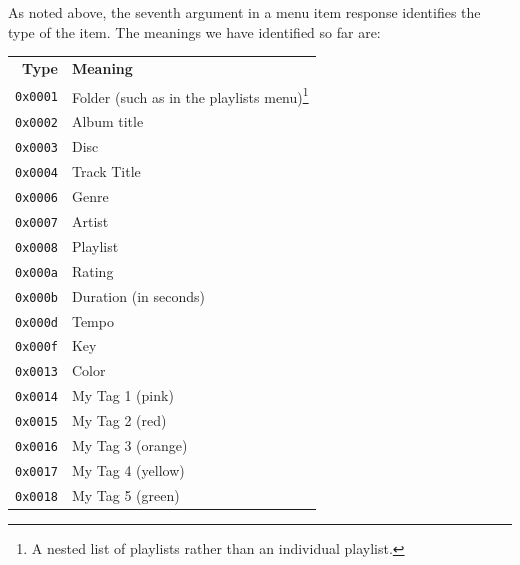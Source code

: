 \documentclass[11pt]{article}
\begin{document}
\begin{samepage}
  As noted above, the seventh argument in a menu item response
  identifies the type of the item. The meanings we have identified so
  far are:

  \begin{center}
    \begin{tabu}{rl}
      \toprule

      \bfseries{Type} & \bfseries{Meaning} \\

      {\tt 0x0001} & Folder (such as in the playlists menu)\footnote{A nested list
        of playlists rather than an individual playlist.} \\

      {\tt 0x0002} & Album title \\

      {\tt 0x0003} & Disc \\

      {\tt 0x0004} & Track Title \\

      {\tt 0x0006} & Genre \\

      {\tt 0x0007} & Artist \\

      {\tt 0x0008} & Playlist \\

      {\tt 0x000a} & Rating \\

      {\tt 0x000b} & Duration (in seconds) \\

      {\tt 0x000d} & Tempo \\

      {\tt 0x000f} & Key \\

      {\tt 0x0013} & Color \\

      {\tt 0x0014} & My Tag 1 (pink) \\

      {\tt 0x0015} & My Tag 2 (red) \\  %

      {\tt 0x0016} & My Tag 3 (orange) \\

      {\tt 0x0017} & My Tag 4 (yellow) \\

      {\tt 0x0018} & My Tag 5 (green) \\


\end{tabu}
\end{center}
\end{samepage}
\end{document}
